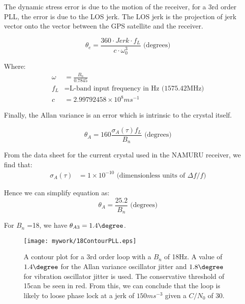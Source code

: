 The dynamic stress error is due to the motion of the receiver, for a 3rd order PLL, the error is due to the \ac{LOS} jerk. The \ac{LOS} jerk is the projection of jerk vector onto the vector between the \ac{GPS} satellite and the receiver.  

\begin{equation}
\theta_e = \frac{360 \cdot Jerk  \cdot f_L}{c  \cdot \omega^3_0} \text{ (degrees)}
\label{eq:DynamicStressError}
\end{equation}

Where:
\begin{align*}
\omega &= \frac{B_n}{0.7845} \\
f_L &= \text{L-band input frequency in Hz (1575.42MHz)}\\ 
c & = 2.99792458 \times 10^8 ms^{-1}
\end{align*}


Finally, the Allan variance is an error which is intrinsic to the crystal itself. 

\begin{equation}
\label{eq:AllanVariance}
\theta_{A} = 160 \frac{\sigma_A(\tau)f_L}{B_n} \text{ (degrees)}
\end{equation}

From the data sheet for the current crystal used in the \ac{NAMURU} receiver\cite{VT803Datasheet}, we find that: 
\begin{align*}
\sigma_A(\tau) &= 1 \times 10^{-10} \text{ (dimensionless units of }\Delta f/f\text{)}
\end{align*}

Hence we can simplify equation \label{eq:AllanVariance} as:
\begin{equation}
\theta_{A} =\frac{25.2}{B_n} \text{ (degrees)}
\label{eq:AllanVariance}
\end{equation}

For $B_n$ =18, we have $\theta_{A3}=1.4\degree$.


\begin{figure}[!htb] 
    \centering
    \texttt{[image: mywork/18ContourPLL.eps]} 
    \caption{A contour plot for a 3rd order loop with a $B_n$ of 18Hz. A value of $1.4\degree$ for the Allan variance oscillator jitter and $1.8\degree$ for vibration oscillator jitter is used. The conservative threshold of 15\degree can be seen in red. From this, we can conclude that the loop is likely to loose phase lock at a jerk of $150ms^{-3}$ given a $C/N_0$ of 30.}
    \label{fig:18HzPLLContourPlot}
\end{figure}

